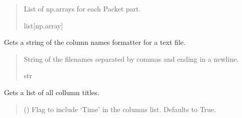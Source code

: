 \documentclass[letterpaper,10pt,english]{sphinxmanual}
\begin{document}
\begin{fulllineitems}
\begin{fulllineitems}
\begin{quote}
\begin{description}
\sphinxAtStartPar
List of np.arrays for each Packet part.

\sphinxAtStartPar
list{[}np.array{]}

\end{description}\end{quote}

\end{fulllineitems}


\begin{fulllineitems}
\label{\detokenize{Morelia.Stream.PodHandler:Morelia.Stream.PodHandler.Handle8274D.Drain8274D.GetDeviceColNames}}
\pysigstartsignatures
{}
\pysigstopsignatures
\sphinxAtStartPar
Gets a string of the column names formatter for a text file.
\begin{quote}\begin{description}
\sphinxAtStartPar
String of the filenames separated by commas and ending in a newline.

\sphinxAtStartPar
str

\end{description}\end{quote}

\end{fulllineitems}


\begin{fulllineitems}
\label{\detokenize{Morelia.Stream.PodHandler:Morelia.Stream.PodHandler.Handle8274D.Drain8274D.GetDeviceColNamesList}}
\pysigstartsignatures
{}
\pysigstopsignatures
\sphinxAtStartPar
Gets a list of all collumn titles.
\begin{quote}\begin{description}
\sphinxAtStartPar
{} (\sphinxstyleliteralemphasis{\sphinxupquote{, }}) \textendash{} Flag to include ‘Time’ in the columns list.                 Defaults to True.


\end{description}
\end{quote}
\end{fulllineitems}
\end{fulllineitems}
\end{document}
